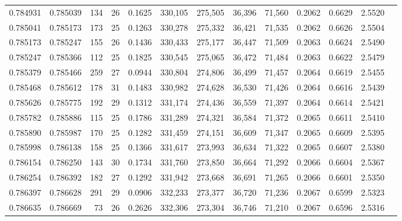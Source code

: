 \begin{tabular}{rrrrrrrrrrrrr}
0.784931 & 0.785039 &   134 &  26 &                                     0.1625 & 330,105 & 275,505 &  36,396 &  71,560 & 0.2062 & 0.6629 & 2.5520 \\
0.785041 & 0.785173 &   173 &  25 &                                     0.1263 & 330,278 & 275,332 &  36,421 &  71,535 & 0.2062 & 0.6626 & 2.5504 \\
0.785173 & 0.785247 &   155 &  26 &                                     0.1436 & 330,433 & 275,177 &  36,447 &  71,509 & 0.2063 & 0.6624 & 2.5490 \\
0.785247 & 0.785366 &   112 &  25 &                                     0.1825 & 330,545 & 275,065 &  36,472 &  71,484 & 0.2063 & 0.6622 & 2.5479 \\
0.785379 & 0.785466 &   259 &  27 &                                     0.0944 & 330,804 & 274,806 &  36,499 &  71,457 & 0.2064 & 0.6619 & 2.5455 \\
0.785468 & 0.785612 &   178 &  31 &                                     0.1483 & 330,982 & 274,628 &  36,530 &  71,426 & 0.2064 & 0.6616 & 2.5439 \\
0.785626 & 0.785775 &   192 &  29 &                                     0.1312 & 331,174 & 274,436 &  36,559 &  71,397 & 0.2064 & 0.6614 & 2.5421 \\
0.785782 & 0.785886 &   115 &  25 &                                     0.1786 & 331,289 & 274,321 &  36,584 &  71,372 & 0.2065 & 0.6611 & 2.5410 \\
0.785890 & 0.785987 &   170 &  25 &                                     0.1282 & 331,459 & 274,151 &  36,609 &  71,347 & 0.2065 & 0.6609 & 2.5395 \\
0.785998 & 0.786138 &   158 &  25 &                                     0.1366 & 331,617 & 273,993 &  36,634 &  71,322 & 0.2065 & 0.6607 & 2.5380 \\
0.786154 & 0.786250 &   143 &  30 &                                     0.1734 & 331,760 & 273,850 &  36,664 &  71,292 & 0.2066 & 0.6604 & 2.5367 \\
0.786254 & 0.786392 &   182 &  27 &                                     0.1292 & 331,942 & 273,668 &  36,691 &  71,265 & 0.2066 & 0.6601 & 2.5350 \\
0.786397 & 0.786628 &   291 &  29 &                                     0.0906 & 332,233 & 273,377 &  36,720 &  71,236 & 0.2067 & 0.6599 & 2.5323 \\
0.786635 & 0.786669 &    73 &  26 &                                     0.2626 & 332,306 & 273,304 &  36,746 &  71,210 & 0.2067 & 0.6596 & 2.5316 \\

\end{tabular}
